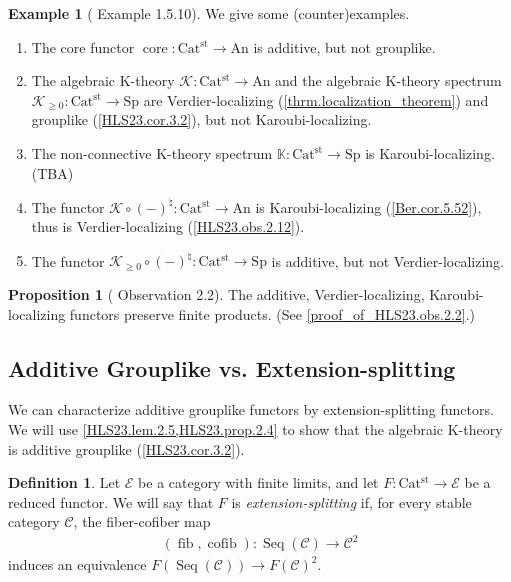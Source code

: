 \documentclass[a4paper,dvipdfmx,11pt,reqno]{amsart}
\DeclareMathOperator{\fib}{fib}
\DeclareMathOperator{\cofib}{cofib}
\newcommand{\C}{\mathcal{C}}
\newcommand{\E}{\mathcal{E}}
\newcommand{\K}{\mathcal{K}}
\DeclareMathOperator{\Seq}{Seq}
\DeclareMathOperator{\core}{core}
\newcommand{\An}{\mathrm{An}}
\newcommand{\Catst}{\mathrm{Cat^{st}}}
\newcommand{\Sp}{\mathrm{Sp}}
\newcommand{\bbK}{\mathbb{K}}
\theoremstyle{definition}
\newtheorem{definition}[theorem]{Definition}
\newtheorem{example}[theorem]{Example}
\newtheorem{proposition}[theorem]{Proposition}
\begin{document}
\begin{example}[\cite{CDH23} Example 1.5.10] \label{CDH23.eg.1.5.10}
  We give some (counter)examples.
  \begin{enumerate}
    \item The core functor $\core : \Catst \to \An$ is additive, but not grouplike. %
    \item The algebraic K-theory $\K : \Catst \to \An$ and the algebraic K-theory spectrum $\K_{\geq 0} : \Catst \to \Sp$ are Verdier-localizing (\cref{thrm.localization_theorem}) and grouplike (\cref{HLS23.cor.3.2}), but not Karoubi-localizing.
    \item The non-connective K-theory spectrum $\bbK : \Catst \to \Sp$ is Karoubi-localizing. (TBA)
    \item The functor $\K \circ (-)^{\natural} : \Catst \to \An$ is Karoubi-localizing (\cref{Ber.cor.5.52}), thus is Verdier-localizing (\cref{HLS23.obs.2.12}).
    \item The functor $\K_{\geq 0} \circ (-)^{\natural} : \Catst \to \Sp$ is additive, but not Verdier-localizing.
  \end{enumerate}
\end{example}

\begin{proposition}[\cite{HLS23} Observation 2.2] \label{HLS23.obs.2.2} %
  The additive, Verdier-localizing, Karoubi-localizing functors preserve finite products.
  (See \cref{proof_of_HLS23.obs.2.2}.)
\end{proposition}

\subsection{Additive Grouplike vs. Extension-splitting}

We can characterize additive grouplike functors by extension-splitting functors.
We will use \cref{HLS23.lem.2.5,HLS23.prop.2.4} to show that the algebraic K-theory is additive grouplike (\cref{HLS23.cor.3.2}).

\begin{definition}
  Let $\E$ be a category with finite limits, and let $F : \Catst \to \E$ be a reduced functor.
  We will say that $F$ is \textit{extension-splitting} if, for every stable category $\C$, the fiber-cofiber map
  \begin{align*}
    (\fib,\cofib) : \Seq(\C) \to \C^2
  \end{align*}
  induces an equivalence $F(\Seq(\C)) \to F(\C)^2$.
\end{definition}
\end{document}

